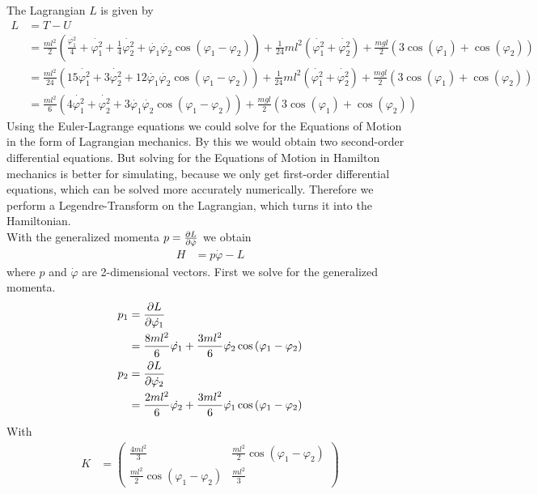 \documentclass{article}
\begin{document}
The Lagrangian $L$ is given by
\begin{align}
	L &= T-U\\
	&= \frac{ml^2}{2}\left(\frac{\dot{\varphi_1^2}}{4}+\dot{\varphi_1^2}+\frac{1}{4}\dot{\varphi_2^2}+\dot{\varphi_1}\dot{\varphi_2}\cos\left(\varphi_1-\varphi_2\right)\right)+\frac{1}{24}ml^2\left(\dot{\varphi_1^2}+\dot{\varphi_2^2}\right) + \frac{mgl}{2}\left(3\cos\left(\varphi_1\right)+\cos\left(\varphi_2\right)\right)\\
	&= \frac{ml^2}{24}\left(15\dot{\varphi_1^2}+3\dot{\varphi_2^2}+12\dot{\varphi_1}\dot{\varphi_2}\cos\left(\varphi_1-\varphi_2\right)\right)+\frac{1}{24}ml^2\left(\dot{\varphi_1^2}+\dot{\varphi_2^2}\right) + \frac{mgl}{2}\left(3\cos\left(\varphi_1\right)+\cos\left(\varphi_2\right)\right)\\
	&= \frac{ml^2}{6}\left(4\dot{\varphi_1^2}+\dot{\varphi_2^2}+3\dot{\varphi_1}\dot{\varphi_2}\cos\left(\varphi_1-\varphi_2\right)\right) + \frac{mgl}{2}\left(3\cos\left(\varphi_1\right)+\cos\left(\varphi_2\right)\right)
\end{align}
Using the Euler-Lagrange equations we could solve for the Equations of Motion in the form of Lagrangian mechanics. By this we would obtain two second-order differential equations. But solving for the Equations of Motion in Hamilton mechanics is better for simulating, because we only get first-order differential equations, which can be solved more accurately numerically. Therefore we perform a Legendre-Transform on the Lagrangian, which turns it into the Hamiltonian.\\
\newpage
\noindent With the generalized momenta $p=\pdv{L}{\dot{\varphi}}$ we obtain
\begin{align}
	H &= p\dot{\varphi} - L
\end{align}
where $p$ and $\dot{\varphi}$ are 2-dimensional vectors. First we solve for the generalized momenta.
\begin{align}
	p_1 &= \pdv{L}{\dot{\varphi_1}}\\
	&= \frac{8ml^2}{6}\dot{\varphi_1}+\frac{3ml^2}{6}\dot{\varphi_2}\cos\left(\varphi_1-\varphi_2\right)\\
	p_2 &= \pdv{L}{\dot{\varphi_2}}\\
	&=  \frac{2ml^2}{6}\dot{\varphi_2}+\frac{3ml^2}{6}\dot{\varphi_1}\cos\left(\varphi_1-\varphi_2\right) 
\end{align}
With
\begin{align}
	K&=\begin{pmatrix}\frac{4ml^2}{3}&\frac{ml^2}{2}\cos\left(\varphi_1-\varphi_2\right)\\\frac{ml^2}{2}\cos\left(\varphi_1-\varphi_2\right)&\frac{ml^2}{3}\end{pmatrix}
\end{align}
\end{document}
